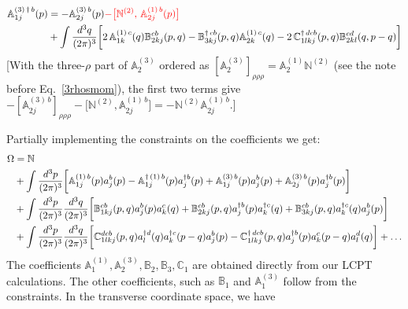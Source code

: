 \documentclass[aps,prd,amsmath,amssymb,nofootinbib]{revtex4-2}
\def\mf#1{\mathbb{#1}}
\numberwithin{equation}{section}
\begin{document}
\begin{align}
 \mf{A}^{(3)\, \dagger\, b}_{1j}(p) & = -\mf{A}^{(3)\, b}_{2j}(p) {\color{red}-\big[\mf{N}^{(2)},\,\mf{A}^{(1)\, b}_{2j}(p)\big]}\notag \\ & +\int \frac{d^{3}q}{(2\pi)^{3}}\bigg[2\, \mf{A}^{(1)\, c}_{1k}(q)\mf{B}^{cb}_{2kj}(p,q)-\mf{B}^{\dagger\, cb}_{3kj}(p,q)\mf{A}^{(1)\,c}_{2k}(q)-2\,\mf{C}^{\dagger\, dcb}_{1lkj}(p,q)\mf{B}^{cd}_{2kl}(q,p-q)\bigg]
 \end{align} {\color{red}[With the three-$\rho$ part of $\mf{A}^{(3)}_2$ ordered as $[\mf{A}^{(3)}_2]_{\rho\rho\rho}=\mf{A}^{(1)}_2\mf{N}^{(2)}$ (see the note before Eq.~\eqref{3rhosmom}), the first two terms give $-[\mf{A}^{(3)\,b}_{2j}]_{\rho\rho\rho}-\big[\mf{N}^{(2)},\mf{A}^{(1)\,b}_{2j}\big]=-\mf{N}^{(2)}\mf{A}^{(1)\,b}_{2j}$.]}\par\noindent
 Partially implementing the constraints on the coefficients we get:
\begin{align}
    \Omega  & = \mf{N}  \notag \\ & +
                \int \frac{d^3p}{(2\pi)^3} 
                \bigg[ 
                   \mf{A}^{(1)\, b}_{1j}(p)a^{b}_{j}(p) 
                -  \mf{A}^{\dagger\, (1)\, b}_{1j} (p) a^{\dagger b}_{j}(p)+ \mf{A}^{(3)\, b}_{1j}(p)a^{b}_{j}(p) 
                +  \mf{A}^{(3)\, b}_{2j} (p) a^{\dagger b}_{j}(p)\bigg] \notag \\ & 
               +\int \frac{d^3p}{(2\pi)^3} \frac{d^3q}{(2\pi)^3} 
               \bigg[\mf{B}^{cb}_{1kj}(p,q) a^{b}_{j}(p)a^{c}_{k}(q) 
                   + \mf{B}^{cb}_{2kj}(p,q) a^{\dagger b}_{j}(p)a^{\dagger c}_{k}(q)
               + \mf{B}^{cb}_{3kj} (p,q) a^{\dagger c}_{k}(q)a^{b}_{j}(p)
               \bigg] \notag \\ & 
               + \int 
               \frac{d^3p}{(2\pi)^3} \frac{d^3q}{(2\pi)^3} 
               \bigg[
                \mf{C}^{ dcb}_{1lkj}(p,q) a^{\dagger d}_{l}(q)  a^{\dagger c}_{k}(p-q)  a^{b}_{j}(p)
               - \mf{C}^{\dagger\, dcb}_{1lkj}(p,q) a^{\dagger b}_{j}(p) a^{c}_{k}(p-q) a^{d}_{l}(q)\bigg] +\ldots
\end{align}
The coefficients $\mf{A}^{(1)}_{1}, \mf{A}^{(3)}_{2}, \mf{B}_{2}, \mf{B}_{3}, \mf{C}_{1}$ are obtained directly from our LCPT calculations. The other coefficients, such as $\mf{B}_{1}$ and $\mf{A}^{(3)}_{1}$ follow from the constraints. In the transverse coordinate space, we have
\end{document}

